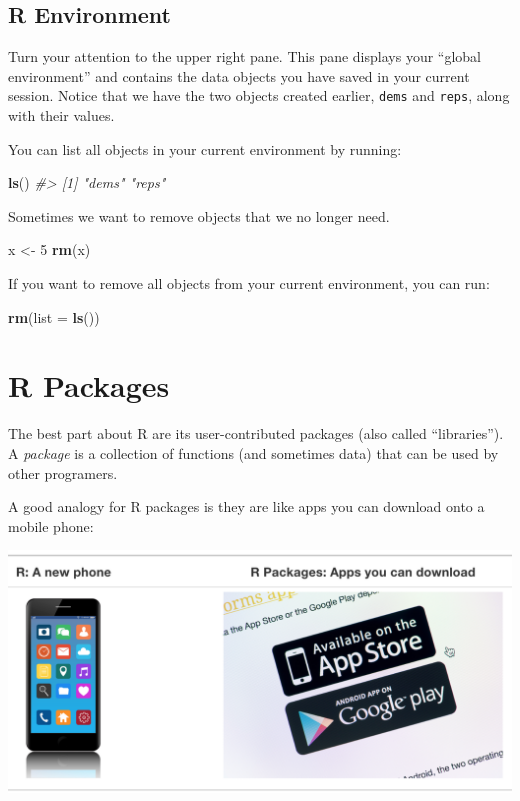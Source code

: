 \documentclass[
]{book}
\newenvironment{Shaded}{\begin{snugshade}}{\end{snugshade}}
\newcommand{\CommentTok}[1]{\textcolor[rgb]{0.56,0.35,0.01}{\textit{#1}}}
\newcommand{\DataTypeTok}[1]{\textcolor[rgb]{0.13,0.29,0.53}{#1}}
\newcommand{\DecValTok}[1]{\textcolor[rgb]{0.00,0.00,0.81}{#1}}
\newcommand{\KeywordTok}[1]{\textcolor[rgb]{0.13,0.29,0.53}{\textbf{#1}}}
\newcommand{\NormalTok}[1]{#1}
\newcommand{\StringTok}[1]{\textcolor[rgb]{0.31,0.60,0.02}{#1}}
\begin{document}
\hypertarget{r-environment}{%
\subsection{R Environment}\label{r-environment}}

Turn your attention to the upper right pane. This pane displays your ``global environment'' and contains the data objects you have saved in your current session. Notice that we have the two objects created earlier, \texttt{dems} and \texttt{reps}, along with their values.

You can list all objects in your current environment by running:

\begin{Shaded}
\begin{Highlighting}[]
\KeywordTok{ls}\NormalTok{()}
\CommentTok{#> [1] "dems" "reps"}
\end{Highlighting}
\end{Shaded}

Sometimes we want to remove objects that we no longer need.

\begin{Shaded}
\begin{Highlighting}[]
\NormalTok{x <-}\StringTok{ }\DecValTok{5}
\KeywordTok{rm}\NormalTok{(x)}
\end{Highlighting}
\end{Shaded}

If you want to remove all objects from your current environment, you can run:

\begin{Shaded}
\begin{Highlighting}[]
\KeywordTok{rm}\NormalTok{(}\DataTypeTok{list =} \KeywordTok{ls}\NormalTok{())}
\end{Highlighting}
\end{Shaded}

\hypertarget{r-packages-1}{%
\section{R Packages}\label{r-packages-1}}

The best part about R are its user-contributed packages (also called ``libraries''). A \emph{package} is a collection of functions (and sometimes data) that can be used by other programers.

A good analogy for R packages is they are like apps you can download onto a mobile phone:

\begin{center}\includegraphics[width=0.7\linewidth]{img/R_vs_R_packages} \end{center}
\end{document}
